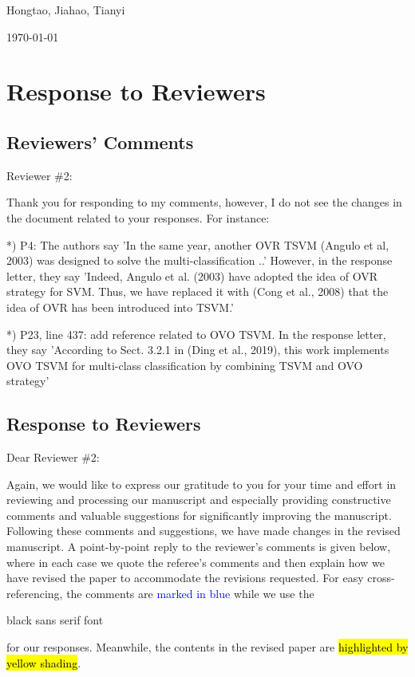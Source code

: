 \documentclass[12pt, review, authoryear]{elsarticle}
\newcounter{reviewer}
\newcounter{point}[reviewer]
\def\mycoauthor{Hongtao, Jiahao, Tianyi}
\def\mydate{\today} %
\begin{document}
\noindent \mycoauthor

\noindent \mydate


\section{Response to Reviewers}
\subsection{Reviewers' Comments}


Reviewer \#2:

Thank you for responding to my comments, however, I do not see the changes in the document related to your responses. For instance:

*) P4: The authors say 'In the same year, another OVR TSVM (Angulo et al, 2003) was designed to solve the multi-classification ..' However, in the response letter, they say 'Indeed, Angulo et al. (2003) have adopted the idea of OVR strategy for SVM. Thus, we have replaced it with (Cong et al., 2008) that the idea of OVR has been introduced into TSVM.'

*) P23, line 437: add reference related to OVO TSVM. In the response letter, they say 'According to Sect. 3.2.1 in (Ding et al., 2019), this work implements OVO TSVM for multi-class classification by combining TSVM and OVO strategy'


\subsection{Response to Reviewers}
\noindent Dear Reviewer \#2:

Again, we would like to express our gratitude to you for your time and effort in reviewing and processing our manuscript and especially providing constructive comments and valuable suggestions for significantly improving the manuscript. Following these comments and suggestions, we have made changes in the revised manuscript. A point-by-point reply to the reviewer's comments is given below, where in each case we quote the referee’s comments and then explain how we have revised the paper to accommodate the revisions requested.
For easy cross-referencing, the comments are \textcolor{blue}{marked in blue} while we use the \begin{sf}black sans serif font\end{sf} for our responses. Meanwhile, the contents in the revised paper are \hl{highlighted by yellow shading}.
\end{document}
